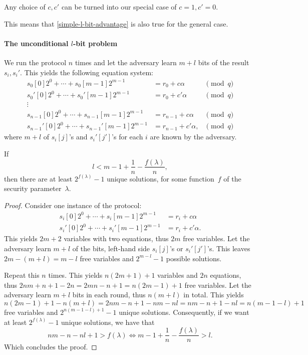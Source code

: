 \begin{lemma}
  Any choice of \(c, c'\) can be turned into our special case of \(c = 1, c' = 
  0\).
\end{lemma}

This means that \cref{simple-l-bit-advantage} is also true for the general case.

\paragraph*{The unconditional \(l\)-bit problem}

We run the protocol \(n\) times and let the adversary learn \(m+l\) bits of the 
result~\(s_i, s_i'\).
This yields the following equation system:
\begin{align*}
  s_0[0]2^0 + \dotsb + s_0[m-1]2^{m-1} &= r_0 + c\alpha &\pmod q\\
  s_0'[0]2^0 + \dotsb + s_0'[m-1]2^{m-1} &= r_0 + c'\alpha &\pmod q\\
  \vdots \\
  s_{n-1}[0]2^0 + \dotsb + s_{n-1}[m-1]2^{m-1} &= r_{n-1} + c\alpha &\pmod q\\
  s_{n-1}'[0]2^0 + \dotsb + s_{n-1}'[m-1]2^{m-1} &= r_{n-1} + c'\alpha, &\pmod 
  q
\end{align*}
where \(m+l\) of \(s_i[j]\)'s and \(s_i'[j']\)'s for each \(i\) are known by 
the adversary.

\begin{lemma}\label{l-bit-advantage}
  If \[l < m-1+\frac{1}{n}-\frac{f(\lambda)}{n},\] then there are at least 
  \(2^{f(\lambda)}-1\) unique solutions, for some function~\(f\) of the 
  security parameter~\(\lambda\).
\end{lemma}
\begin{proof}
  Consider one instance of the protocol:
  \begin{align*}
    s_i[0]2^0 + \dotsb + s_i[m-1]2^{m-1} &= r_i + c\alpha \\
    s_i'[0]2^0 + \dotsb + s_i'[m-1]2^{m-1} &= r_i + c'\alpha.
  \end{align*}
  This yields \(2m+2\) variables with two equations, thus \(2m\) free variables.
  Let the adversary learn \(m+l\) of the bits, \ie left-hand side \(s_i[j]\)'s or 
  \(s_i'[j']\)'s.
  This leaves \(2m-(m+l) = m-l\) free variables and \(2^{m-l}-1\) possible 
  solutions.

  Repeat this \(n\) times.
  This yields \(n(2m+1)+1\) variables and \(2n\) equations, thus \(2nm+n+1-2n = 
  2mn - n +1 = n(2m-1)+1\) free variables.
  Let the adversary learn \(m+l\) bits in each round, thus \(n(m+l)\) in total.
  This yields \(n(2m-1)+1 -n(m+l) = 2nm-n+1-nm-nl = nm-n+1-nl = n(m-1-l)+1\) 
  free variables and \(2^{n(m-1-l)+1}-1\) unique solutions.
  Consequently, if we want at least \(2^{f(\lambda)}-1\) unique solutions, we 
  have that
  \begin{equation*}
    nm-n-nl+1 > f(\lambda) \iff m-1+\frac{1}{n}-\frac{f(\lambda)}{n} > l.
  \end{equation*}
  Which concludes the proof.
\end{proof}

